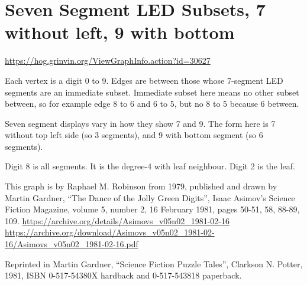 \documentclass{article}
\begin{document}
\section{Seven Segment LED Subsets, 7 without left, 9 with bottom}

\url{https://hog.grinvin.org/ViewGraphInfo.action?id=30627}

\medskip

Each vertex is a digit 0 to 9.  Edges are between those whose
7-segment LED segments are an immediate subset.  Immediate subset here
means no other subset between, so for example edge 8 to 6 and 6 to 5,
but no 8 to 5 because 6 between.

Seven segment displays vary in how they show 7 and 9.  The form here
is 7 without top left side (so 3 segments), and 9 with bottom segment
(so 6 segments).

Digit 8 is all segments.  It is the degree-4 with leaf neighbour.
Digit 2 is the leaf.

This graph is by Raphael M. Robinson from 1979, published and drawn by
Martin Gardner, ``The Dance of the Jolly Green Digits'', Isaac Asimov's
Science Fiction Magazine, volume 5, number 2, 16 February 1981, pages
50-51, 58, 88-89, 109. \newline
\url{https://archive.org/details/Asimovs_v05n02_1981-02-16} \newline
\url{https://archive.org/download/Asimovs_v05n02_1981-02-16/Asimovs_v05n02_1981-02-16.pdf}

Reprinted in Martin Gardner, ``Science Fiction Puzzle Tales'',
Clarkson
N. Potter, 1981, ISBN 0-517-54380X hardback and 0-517-543818
paperback.

\smallskip

\begin{center}
\end{center}
\end{document}
